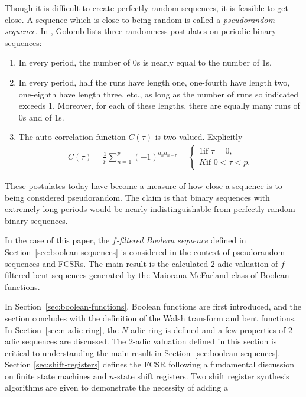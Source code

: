 \documentclass[english]{article}
\theoremstyle{plain}
\theoremstyle{definition}
\theoremstyle{remark}
\begin{document}
\par Though it is difficult to create perfectly random sequences, it is feasible
to get close. A sequence which is close to being random is called a
{\em pseudorandom sequence}. In \cite{bk:g82}, Golomb lists three randomness
postulates on periodic binary sequences:
\begin{enumerate}[R-1.]
	\item In every period, the number of 0s is nearly equal to the number of 1s.
	\item In every period, half the runs have length one, one-fourth have length
		two, one-eighth have length three, etc., as long as the number of runs so
		indicated exceeds 1. Moreover, for each of these lengths, there are equally
		many runs of 0s and of 1s.
	\item The auto-correlation function $C(\tau)$ is two-valued. Explicitly
		\begin{align*}
      C(\tau)=\frac{1}{p}\sum_{n=1}^p(-1)^{a_na_{n+\tau}}=
			\begin{cases}
				1 \text{if } \tau=0,\\
				K \text{if } 0<\tau<p.
			\end{cases}
		\end{align*}
\end{enumerate}
These postulates today have become a measure of how close a sequence is to being
considered pseudorandom. The claim is that binary sequences with extremely long
periods would be nearly indistinguishable from perfectly random binary
sequences.
\par In the case of this paper, the {\it $f$-filtered Boolean sequence} defined
in Section~\ref{sec:boolean-sequences} is considered in the context of
pseudorandom sequences and FCSRs. The main result is the calculated 2-adic
valuation of $f$-filtered bent sequences generated by the Maiorana-McFarland
class of Boolean functions.
\par In Section~\ref{sec:boolean-functions}, Boolean
functions are first introduced, and the section concludes with the definition of
the Walsh transform and bent functions. In Section~\ref{sec:n-adic-ring}, the
$N$-adic ring is defined and a few properties of $2$-adic sequences are
discussed. The $2$-adic valuation defined in this section is critical to
understanding the main result in Section~\ref{sec:boolean-sequences}. Section
\ref{sec:shift-registers} defines the FCSR following a fundamental discussion on
finite state machines and $n$-state shift registers. Two shift register
synthesis algorithms are given to demonstrate the necessity of adding a
\end{document}
